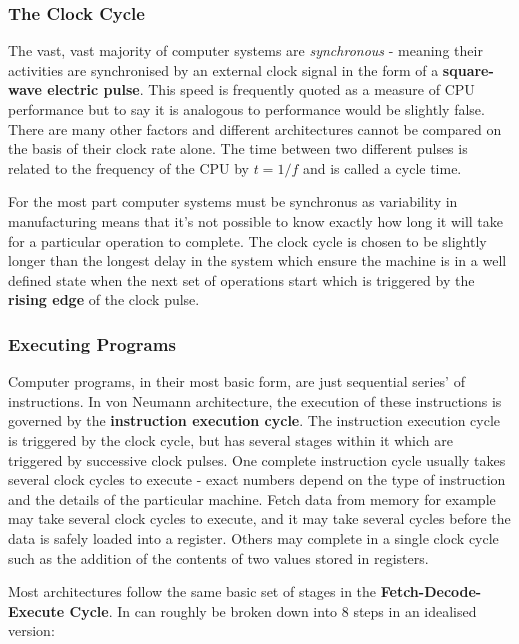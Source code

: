 \documentclass{article}
\begin{document}
	\subsubsection{The Clock Cycle}
	The vast, vast majority of computer systems are \textit{synchronous} - meaning their activities are synchronised by an external clock signal in the form of a \textbf{square-wave electric pulse}. This speed is frequently quoted as a measure of CPU performance but to say it is analogous to performance would be slightly false. There are many other factors and different architectures cannot be compared on the basis of their clock rate alone. The time between two different pulses is related to the frequency of the CPU by $t = 1 / f$ and is called a cycle time.
	
	\par 
	For the most part computer systems must be synchronus as variability in manufacturing means that it's not possible to know exactly how long it will take for a particular operation to complete. The clock cycle is chosen to be slightly longer than the longest delay in the system which ensure the machine is in a well defined state when the next set of operations start which is triggered by the \textbf{rising edge} of the clock pulse.
	
	\subsubsection{Executing Programs}	
	Computer programs, in their most basic form, are just sequential series' of instructions. In von Neumann architecture, the execution of these instructions is governed by the \textbf{instruction execution cycle}. The instruction execution cycle is triggered by the clock cycle, but has several stages within it which are triggered by successive clock pulses. One complete instruction cycle usually takes several clock cycles to execute - exact numbers depend on the type of instruction and the details of the particular machine. Fetch data from memory for example may take several clock cycles to execute, and it may take several cycles before the data is safely loaded into a register. Others may complete in a single clock cycle such as the addition of the contents of two values stored in registers.
	
	\par 
	Most architectures follow the same basic set of stages in the \textbf{Fetch-Decode-Execute Cycle}. In can roughly be broken down into 8 steps in an idealised version:
	
\end{document}
